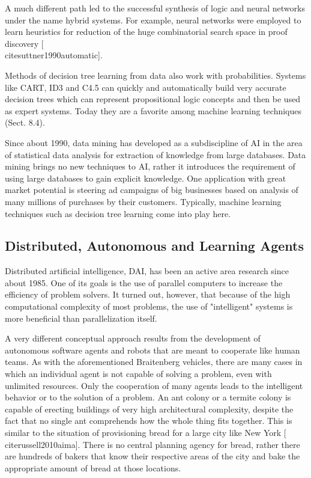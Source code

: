 \documentclass[10pt]{book}
\begin{document}
A much different path led to the successful synthesis of logic and neural networks under the name hybrid systems. For example, neural networks were employed to learn heuristics for reduction of the huge combinatorial search space in proof discovery [\\cite{suttner1990automatic}].

Methods of decision tree learning from data also work with probabilities. Systems like CART, ID3 and C4.5 can quickly and automatically build very accurate decision trees which can represent propositional logic concepts and then be used as expert systems. Today they are a favorite among machine learning techniques (Sect. 8.4).

Since about 1990, data mining has developed as a subdiscipline of AI in the area of statistical data analysis for extraction of knowledge from large databases. Data mining brings no new techniques to AI, rather it introduces the requirement of using large databases to gain explicit knowledge. One application with great market potential is steering ad campaigns of big businesses based on analysis of many millions of purchases by their customers. Typically, machine learning techniques such as decision tree learning come into play here.

\subsection{Distributed, Autonomous and Learning Agents}
Distributed artificial intelligence, DAI, has been an active area research since about 1985. One of its goals is the use of parallel computers to increase the efficiency of problem solvers. It turned out, however, that because of the high computational complexity of most problems, the use of "intelligent" systems is more beneficial than parallelization itself.

A very different conceptual approach results from the development of autonomous software agents and robots that are meant to cooperate like human teams. As with the aforementioned Braitenberg vehicles, there are many cases in which an individual agent is not capable of solving a problem, even with unlimited resources. Only the cooperation of many agents leads to the intelligent behavior or to the solution of a problem. An ant colony or a termite colony is capable of erecting buildings of very high architectural complexity, despite the fact that no single ant comprehends how the whole thing fits together. This is similar to the situation of provisioning bread for a large city like New York [\\cite{russell2010aima}]. There is no central planning agency for bread, rather there are hundreds of bakers that know their respective areas of the city and bake the appropriate amount of bread at those locations.
\end{document}
